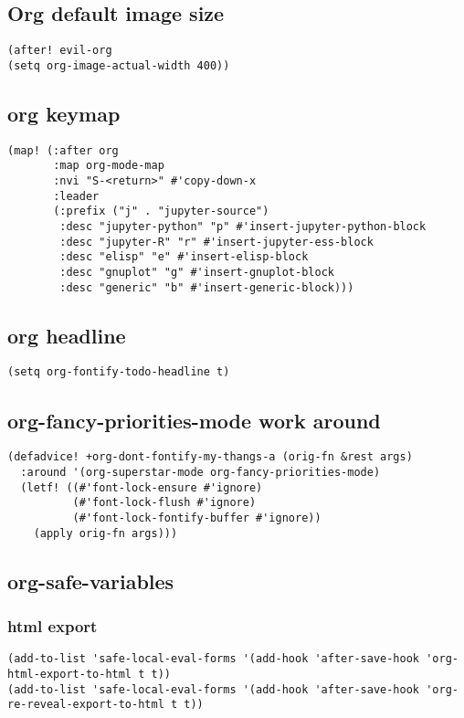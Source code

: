 \documentclass[11pt]{article}
\begin{document}
\subsection*{Org default image size}
\label{sec:orge1a5c14}
\begin{verbatim}
(after! evil-org
(setq org-image-actual-width 400))
\end{verbatim}

\subsection*{org keymap}
\label{sec:org8b9ad5d}
\begin{verbatim}
(map! (:after org
       :map org-mode-map
       :nvi "S-<return>" #'copy-down-x
       :leader
       (:prefix ("j" . "jupyter-source")
        :desc "jupyter-python" "p" #'insert-jupyter-python-block
        :desc "jupyter-R" "r" #'insert-jupyter-ess-block
        :desc "elisp" "e" #'insert-elisp-block
        :desc "gnuplot" "g" #'insert-gnuplot-block
        :desc "generic" "b" #'insert-generic-block)))
\end{verbatim}

\subsection*{org headline}
\label{sec:orga19f8de}
\begin{verbatim}
(setq org-fontify-todo-headline t)
\end{verbatim}
\subsection*{org-fancy-priorities-mode work around}
\label{sec:org62df01f}
\begin{verbatim}
(defadvice! +org-dont-fontify-my-thangs-a (orig-fn &rest args)
  :around '(org-superstar-mode org-fancy-priorities-mode)
  (letf! ((#'font-lock-ensure #'ignore)
          (#'font-lock-flush #'ignore)
          (#'font-lock-fontify-buffer #'ignore))
    (apply orig-fn args)))
\end{verbatim}
\subsection*{org-safe-variables}
\label{sec:org0854516}
\subsubsection*{html export}
\label{sec:org6b035c0}
\begin{verbatim}
(add-to-list 'safe-local-eval-forms '(add-hook 'after-save-hook 'org-html-export-to-html t t))
(add-to-list 'safe-local-eval-forms '(add-hook 'after-save-hook 'org-re-reveal-export-to-html t t))
\end{verbatim}
\end{document}
